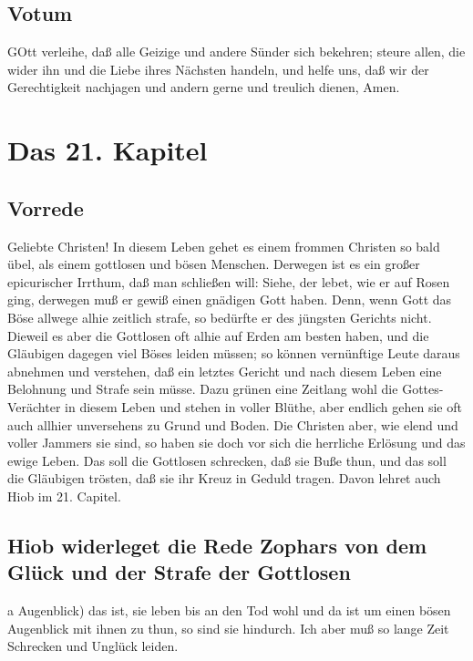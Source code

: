 \section{Votum}

GOtt verleihe, daß alle Geizige und andere Sünder sich bekehren; steure allen, die wider ihn und die Liebe ihres Nächsten handeln, und helfe uns, daß wir der Gerechtigkeit nachjagen und andern gerne und treulich dienen, Amen.

\chapter{Das 21. Kapitel}

\section{Vorrede}

Geliebte Christen! In diesem Leben gehet es einem frommen Christen so bald übel, als einem gottlosen und bösen Menschen. Derwegen ist es ein großer epicurischer Irrthum, daß man schließen will: Siehe, der lebet, wie er auf Rosen ging, derwegen muß er gewiß einen gnädigen Gott haben. Denn, wenn Gott das Böse allwege alhie zeitlich strafe, so bedürfte er des jüngsten Gerichts nicht. Dieweil es aber die Gottlosen oft alhie auf Erden am besten haben, und die Gläubigen dagegen viel Böses leiden müssen; so können vernünftige Leute daraus abnehmen und verstehen, daß ein letztes Gericht und nach diesem Leben eine Belohnung und Strafe sein müsse. Dazu grünen eine Zeitlang wohl die Gottes-Verächter in diesem Leben und stehen in voller Blüthe, aber endlich gehen sie oft auch allhier unversehens zu Grund und Boden. Die Christen aber, wie elend und voller Jammers sie sind, so haben sie doch vor sich die herrliche Erlösung und das ewige Leben. Das soll die Gottlosen schrecken, daß sie Buße thun, und das soll die Gläubigen trösten, daß sie ihr Kreuz in Geduld tragen. Davon lehret auch Hiob im 21. Capitel.

\section[Hiob widerleget die Rede Zophars von dem Glück]{Hiob widerleget die Rede Zophars von dem Glück und der Strafe der Gottlosen}

a Augenblick) das ist, sie leben bis an den Tod wohl und da ist um einen bösen Augenblick mit ihnen zu thun, so sind sie hindurch. Ich aber muß so lange Zeit Schrecken und Unglück leiden.


